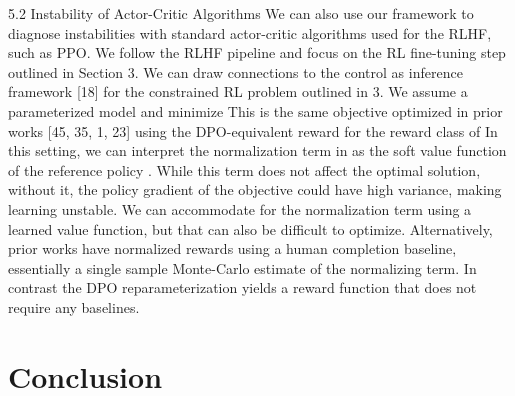 \documentclass[a4paper, 12pt]{article}
\begin{document}
5.2 Instability of Actor-Critic Algorithms
We can also use our framework to diagnose instabilities with standard actor-critic algorithms used
for the RLHF, such as PPO. We follow the RLHF pipeline and focus on the RL fine-tuning step
outlined in Section 3. We can draw connections to the control as inference framework [18] for the
constrained RL problem outlined in 3. We assume a parameterized model and minimize
This is the same objective optimized in prior works [45, 35, 1, 23] using the DPO-equivalent reward
for the reward class of In this setting, we can interpret the normalization term in 
as the soft value function of the reference policy . While this term does not affect the optimal
solution, without it, the policy gradient of the objective could have high variance, making learning
unstable. We can accommodate for the normalization term using a learned value function, but that
can also be difficult to optimize. Alternatively, prior works have normalized rewards using a human
completion baseline, essentially a single sample Monte-Carlo estimate of the normalizing term. In
contrast the DPO reparameterization yields a reward function that does not require any baselines.

\section{Conclusion}\label{sec:Conclusion}



\end{document}
